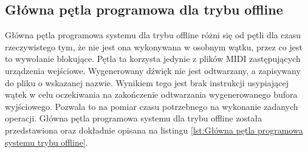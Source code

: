\subsection{Główna pętla programowa dla trybu offline}
Główna pętla programowa systemu dla trybu offline różni się od pętli dla czasu rzeczywistego tym, że nie jest ona wykonywana w osobnym wątku, przez co jest to wywołanie blokujące. Pętla ta korzysta jedynie z plików MIDI zastępujących urządzenia wejściowe. Wygenerowany dźwięk nie jest odtwarzany, a zapisywany do pliku o wskazanej nazwie. Wynikiem tego jest brak instrukcji usypiającej wątek w celu oczekiwania na zakończenie odtwarzania wygenerowanego bufora wyjściowego. Pozwala to na pomiar czasu potrzebnego na wykonanie zadanych operacji. Główna pętla programowa systemu dla trybu offline została przedstawiona oraz dokładnie opisana na listingu \ref{lst:Główna pętla programowa systemu trybu offline}.

